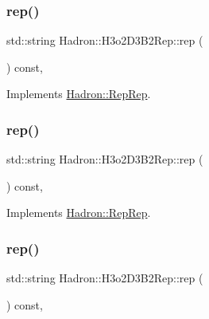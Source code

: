 \subsubsection{\texorpdfstring{rep()}{rep()}\hspace{0.1cm}{\footnotesize\ttfamily [1/3]}}
{\footnotesize\ttfamily std\+::string Hadron\+::\+H3o2\+D3\+B2\+Rep\+::rep (\begin{DoxyParamCaption}{ }\end{DoxyParamCaption}) const\hspace{0.3cm}{\ttfamily [inline]}, {\ttfamily [virtual]}}



Implements \mbox{\hyperlink{structHadron_1_1RepRep_ab3213025f6de249f7095892109575fde}{Hadron\+::\+Rep\+Rep}}.

\mbox{\label{structHadron_1_1H3o2D3B2Rep_a7b7bbc5fa5a2e13412b53abb425dc0fd}} 
\subsubsection{\texorpdfstring{rep()}{rep()}\hspace{0.1cm}{\footnotesize\ttfamily [2/3]}}
{\footnotesize\ttfamily std\+::string Hadron\+::\+H3o2\+D3\+B2\+Rep\+::rep (\begin{DoxyParamCaption}{ }\end{DoxyParamCaption}) const\hspace{0.3cm}{\ttfamily [inline]}, {\ttfamily [virtual]}}



Implements \mbox{\hyperlink{structHadron_1_1RepRep_ab3213025f6de249f7095892109575fde}{Hadron\+::\+Rep\+Rep}}.

\mbox{\label{structHadron_1_1H3o2D3B2Rep_a7b7bbc5fa5a2e13412b53abb425dc0fd}} 
\subsubsection{\texorpdfstring{rep()}{rep()}\hspace{0.1cm}{\footnotesize\ttfamily [3/3]}}
{\footnotesize\ttfamily std\+::string Hadron\+::\+H3o2\+D3\+B2\+Rep\+::rep (\begin{DoxyParamCaption}{ }\end{DoxyParamCaption}) const\hspace{0.3cm}{\ttfamily [inline]}, {\ttfamily [virtual]}}



